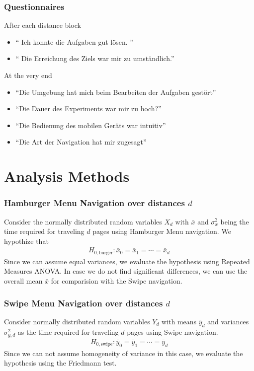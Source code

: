 \documentclass{beamer}
\begin{document}
\begin{frame}
        \frametitle{Questionnaires}
        \begin{block}{After each distance block}
                \begin{itemize}
                        \item `` Ich konnte die Aufgaben gut lösen. ''
                        \item `` Die Erreichung des Ziels war mir zu umständlich.''
                \end{itemize}
        \end{block}
        \begin{block}{At the very end}
                \begin{itemize}
                        \item ``Die Umgebung hat mich beim Bearbeiten der Aufgaben gestört''
                        \item ``Die Dauer des Experiments war mir zu hoch?''
                        \item ``Die Bedienung des mobilen Geräts war intuitiv''
                        \item ``Die Art der Navigation hat mir zugesagt''
                \end{itemize}
        \end{block}
\end{frame}

\section{Analysis Methods}
\begin{frame}
        \frametitle{Hamburger Menu Navigation over distances $d$}
        Consider the normally distributed random variables $X_d$ with $\bar x$ and
        $\sigma_x^2$ being the time required for traveling $d$ pages using Hamburger
        Menu navigation.
        We hypothize that
        \begin{align*}
                H_{0, \text{burger}}: \bar x_0 = \bar x_1 = \cdots = \bar x_d
        \end{align*}
        Since we can assume equal variances,
        we evaluate the hypothesis using Repeated Measures {ANOVA}.
        In case we do not find significant differences, we can use the overall mean
        $\bar x$ for comparision with the Swipe navigation. 
\end{frame}

\begin{frame}
        \frametitle{Swipe Menu Navigation over distances $d$}
        Consider normally
        distributed random variables $Y_d$ with means $\bar y_d$ and variances $\sigma_{y,d}^2$ as the
        time required for traveling $d$ pages using Swipe navigation. 
        \begin{align*}
                H_{0, \text{swipe}}: \bar y_0 = \bar y_1= \cdots = \bar y_d
        \end{align*}
        Since we can not assume homogeneity of variance in this case,
        we evaluate the hypothesis using the Friedmann test. 
\end{frame}
\end{document}
